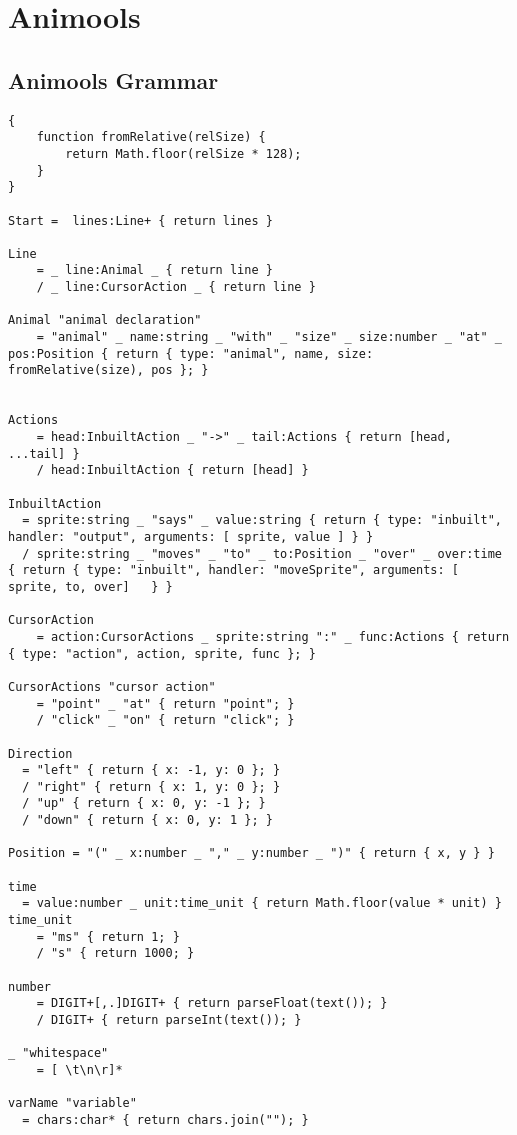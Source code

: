 \chapter{Animools}
\section{Animools Grammar}
\begin{lstlisting}[language=PEG, label={app:animools:grammar}, caption={Animools Language Grammar}]
{
    function fromRelative(relSize) {
    	return Math.floor(relSize * 128);
    }
}

Start =  lines:Line+ { return lines }

Line
	= _ line:Animal _ { return line }
    / _ line:CursorAction _ { return line }

Animal "animal declaration"
    = "animal" _ name:string _ "with" _ "size" _ size:number _ "at" _ pos:Position { return { type: "animal", name, size: fromRelative(size), pos }; }


Actions
    = head:InbuiltAction _ "->" _ tail:Actions { return [head, ...tail] }
    / head:InbuiltAction { return [head] }

InbuiltAction
  = sprite:string _ "says" _ value:string { return { type: "inbuilt", handler: "output", arguments: [ sprite, value ] } }
  / sprite:string _ "moves" _ "to" _ to:Position _ "over" _ over:time { return { type: "inbuilt", handler: "moveSprite", arguments: [ sprite, to, over]   } }

CursorAction
	= action:CursorActions _ sprite:string ":" _ func:Actions { return { type: "action", action, sprite, func }; }

CursorActions "cursor action"
	= "point" _ "at" { return "point"; }
	/ "click" _ "on" { return "click"; }

Direction
  = "left" { return { x: -1, y: 0 }; }
  / "right" { return { x: 1, y: 0 }; }
  / "up" { return { x: 0, y: -1 }; }
  / "down" { return { x: 0, y: 1 }; }

Position = "(" _ x:number _ "," _ y:number _ ")" { return { x, y } }

time
  = value:number _ unit:time_unit { return Math.floor(value * unit) }
time_unit
	= "ms" { return 1; }
	/ "s" { return 1000; }

number
    = DIGIT+[,.]DIGIT+ { return parseFloat(text()); }
    / DIGIT+ { return parseInt(text()); }
    
_ "whitespace"
    = [ \t\n\r]*

varName "variable"
  = chars:char* { return chars.join(""); }



\end{lstlisting}
